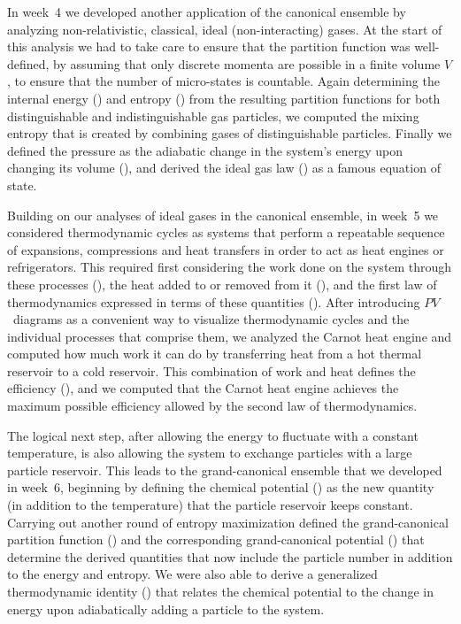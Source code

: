 In week~4 we developed another application of the canonical ensemble by analyzing non-relativistic, classical, ideal (non-interacting) gases.
At the start of this analysis we had to take care to ensure that the partition function was well-defined, by assuming that only discrete momenta are possible in a finite volume $V$, to ensure that the number of micro-states is countable.
Again determining the internal energy () and entropy () from the resulting partition functions for both distinguishable and indistinguishable gas particles, we computed the mixing entropy that is created by combining gases of distinguishable particles.
Finally we defined the pressure as the adiabatic change in the system's energy upon changing its volume (), and derived the ideal gas law () as a famous equation of state.

Building on our analyses of ideal gases in the canonical ensemble, in week~5 we considered thermodynamic cycles as systems that perform a repeatable sequence of expansions, compressions and heat transfers in order to act as heat engines or refrigerators.
This required first considering the work done on the system through these processes (), the heat added to or removed from it (), and the first law of thermodynamics expressed in terms of these quantities ().
After introducing $PV$~diagrams as a convenient way to visualize thermodynamic cycles and the individual processes that comprise them, we analyzed the Carnot heat engine and computed how much work it can do by transferring heat from a hot thermal reservoir to a cold reservoir.
This combination of work and heat defines the efficiency (), and we computed that the Carnot heat engine achieves the maximum possible efficiency allowed by the second law of thermodynamics.

The logical next step, after allowing the energy to fluctuate with a constant temperature, is also allowing the system to exchange particles with a large particle reservoir.
This leads to the grand-canonical ensemble that we developed in week~6, beginning by defining the chemical potential () as the new quantity (in addition to the temperature) that the particle reservoir keeps constant.
Carrying out another round of entropy maximization defined the grand-canonical partition function () and the corresponding grand-canonical potential () that determine the derived quantities that now include the particle number in addition to the energy and entropy.
We were also able to derive a generalized thermodynamic identity () that relates the chemical potential to the change in energy upon adiabatically adding a particle to the system.

